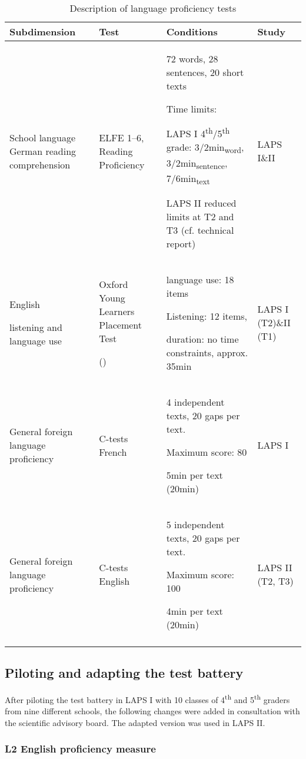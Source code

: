 \documentclass[output=paper]{langsci/langscibook}
\begin{document}
\begin{table}\footnotesize
\begin{tabularx}{\textwidth}{QQQl}
\lsptoprule
{Subdimension} & {Test} & {Conditions} & {Study}\\\midrule
School language German reading comprehension & ELFE 1--6, Reading Proficiency \citep{LenhardSchneider2006} & 72 words, 28 sentences, 20 short texts

Time limits:

LAPS I 4\textsuperscript{th}/5\textsuperscript{th} grade: 3/2min\textsubscript{word}, 3/2min\textsubscript{sentence}, 7/6min\textsubscript{text}

LAPS II reduced limits at T2 and T3 (cf. technical report) & LAPS I\&II\\
English 

listening and language use & Oxford Young Learners Placement Test

(\citealt{Testing2013}) & language use: 18 items

Listening: 12 items,

duration: no time constraints, approx. 35min & LAPS I (T2)\&II (T1)\\
General foreign language proficiency & C-tests French & 4 independent texts, 20 gaps per text.

Maximum score: 80

5min per text (20min) & LAPS I\\
General foreign language proficiency & C-tests English & 5 independent texts, 20 gaps per text.

Maximum score: 100

4min per text (20min) & LAPS II (T2, T3)\\
\lspbottomrule
\end{tabularx}
\caption{Description of language proficiency tests\label{tab:tests:part-4}}
\end{table}

\subsection{Piloting and adapting the test battery}\label{sec:02:3.6}

After piloting the test battery in LAPS I with 10 classes of 4\textsuperscript{th} and 5\textsuperscript{th} graders from nine different schools, the following changes were added in consultation with the scientific advisory board. The adapted version was used in LAPS II.

\subsubsection{L2 English proficiency measure}
\end{document}
